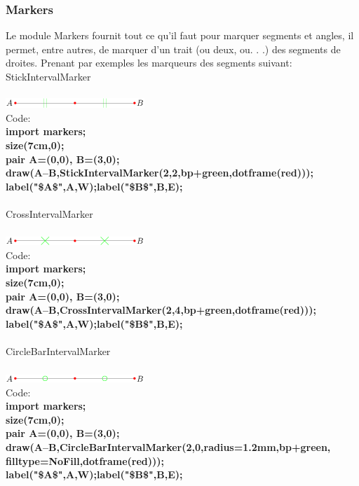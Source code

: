 \documentclass[a4paper]{report}
\begin{document}
\subsubsection{Markers}
Le module Markers fournit tout ce qu’il faut pour marquer segments et angles, il permet, entre autres, de marquer d’un trait (ou deux, ou. . .) des segments de droites.
Prenant par exemples les marqueurs des segments suivant:\\
{\color {blue} StickIntervalMarker}\\\\
\includegraphics{images/Des1.png}\\
Code:\\
\textbf{import markers;\\
size(7cm,0);\\
pair A=(0,0), B=(3,0);\\
draw(A--B,StickIntervalMarker(2,2,bp+green,dotframe(red)));\\
label("\$A\$",A,W);label("\$B\$",B,E);}\\\\
{\color{blue} CrossIntervalMarker}\\\\
\includegraphics{images/Des2.png}\\
Code:\\
\textbf{import markers;\\
size(7cm,0);\\
pair A=(0,0), B=(3,0);\\
draw(A--B,CrossIntervalMarker(2,4,bp+green,dotframe(red)));\\
label("\$A\$",A,W);label("\$B\$",B,E);}\\\\
{\color{blue} CircleBarIntervalMarker}\\\\
\includegraphics[]{images/Des3.png}\\
Code:\\
\textbf{import markers;\\
size(7cm,0);\\
pair A=(0,0), B=(3,0);\\
draw(A--B,CircleBarIntervalMarker(2,0,radius=1.2mm,bp+green,\\ filltype=NoFill,dotframe(red)));\\
label("\$A\$",A,W);label("\$B\$",B,E);}\\\\
\end{document}
